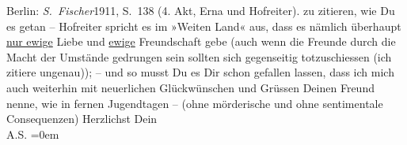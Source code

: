 \begin{ledgroupsized}[t]{13cm}
{{{                     Berlin: \emph{S. Fischer}1911, S. 138 (4. Akt, Erna und Hofreiter). }}}\label{K_L03519-2h} zu
               zitieren, wie Du es getan – Hofreiter spricht es im »Weiten Land«
               aus, dass es nämlich überhaupt \uline{nur ewige} Liebe und
                  \uline{ewige} Freundschaft gebe (auch wenn die Freunde
               durch die Macht der Umstände gedrungen sein sollten sich gegenseitig totzuschiessen
               (ich zitiere ungenau)); – und so musst Du es Dir schon gefallen lassen, dass ich mich
               auch weiterhin mit neuerlichen Glückwünschen und Grüssen Deinen Freund nenne, wie in
               fernen Jugendtagen – (ohne mörderische und ohne sentimentale Consequenzen)\pend
           \pstart
           Herzlichst Dein {\\[\baselineskip]}\spacefill\mbox{A.S.}\pend
           \leftskip=0em{}
         
         \endnumbering{}\end{ledgroupsized}  \newcommand{\dateiname}{L03519}\newcommand{\titel}{Arthur Schnitzler an Paul Goldmann, 9. 3. 1925}\newcommand{\editorInnen}{Martin Anton Müller und Laura Untner}
      